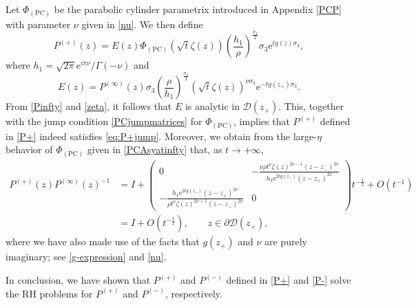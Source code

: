 \documentclass[11pt,a4paper]{article}
\numberwithin{equation}{section}
\begin{document}
Let $\Phi_{(\mathrm{PC})}$ be the parabolic cylinder parametrix introduced in Appendix \ref{PCP} with parameter $\nu$ given in \eqref{nu}. We then define
\begin{equation}\label{P+}
{P}^{(+)}(z)=E(z)\Phi_{(\mathrm{PC})}\left(\sqrt{t}\zeta(z)\right)
\left(\frac{h_1}{\rho}\right)^{\frac{\sigma_3}{2}}\sigma_3\mathrm{e}^{tg(z)\sigma_3},
\end{equation}
where $h_1=\sqrt{2\pi}\text{e}^{i\pi\nu}/\Gamma(-\nu)$ and
\begin{equation}\label{E-expression}
E(z)={P}^{(\infty)}(z)\sigma_3
\left(\frac{\rho}{h_1}\right)^{\frac{\sigma_3}{2}}
\left(\sqrt{t}\zeta(z)\right)^{\nu\sigma_3}\mathrm{e}^{-tg(z_+)\sigma_3}.
\end{equation}
From \eqref{Pinfty} and \eqref{zeta}, it follows that $E$ is analytic in $\mathcal{D}(z_+)$. This, together with the jump condition \eqref{PCjumpmatrices} for $\Phi_{(\mathrm{PC})}$, implies that ${P}^{(+)}$ defined in \eqref{P+} indeed satisfies \eqref{eq:P+jump}.
Moreover, we obtain from the large-$\eta$ behavior of $\Phi_{(\mathrm{PC})}$ given in \eqref{PCAsyatinfty} that, as $t\to+\infty$,
\begin{align}\label{P+Pinfty}
P^{(+)}(z)P^{(\infty)}(z)^{-1}&=I+\begin{pmatrix} 0 & -\frac{\nu\rho{t}^{\nu}\zeta(z)^{2\nu-1}(z-z_-)^{2\nu}}
{h_1\mathrm{e}^{2tg(z_+)}(z-z_+)^{2\nu}} \\ -\frac{h_1\mathrm{e}^{2tg(z_+)}(z-z_+)^{2\nu}}
{\rho{t}^{\nu}\zeta(z)^{2\nu+1}(z-z_-)^{2\nu}} & 0 \end{pmatrix}t^{-\frac{1}{2}}+O\left(t^{-1}\right)\nonumber\\
&=I+O\left(t^{-\frac{1}{2}}\right), \qquad z\in \partial\mathcal{D}(z_+),
\end{align}
where we have also made use of the facts that $g(z_+)$ and $\nu$ are purely imaginary; see \eqref{g-expression} and \eqref{nu}.

In conclusion, we have shown that ${P}^{(+)}$ and ${P}^{(-)}$ defined in \eqref{P+} and \eqref{P-} solve the RH problems for ${P}^{(+)}$ and ${P}^{(-)}$, respectively.

\end{document}
